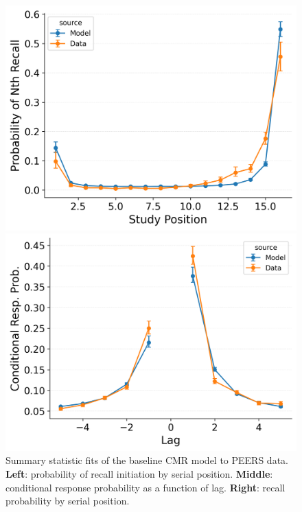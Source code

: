 \documentclass[
  man,
  floatsintext,
  longtable,
  nolmodern,
  notxfonts,
  notimes,
  draftfirst,
  colorlinks=true,linkcolor=blue,citecolor=blue,urlcolor=blue]{apa7}
\begin{document}
\begin{figure}

\caption{\label{fig-cmr}Summary statistic fits of the baseline CMR model
to PEERS data. \textbf{Left}: probability of recall initiation by serial
position. \textbf{Middle}: conditional response probability as a
function of lag. \textbf{Right}: recall probability by serial position.}

\begin{minipage}{0.33\linewidth}
\includegraphics{figures/HealeyKahana2014_BaseCMR_Fitting_pnr.png}\end{minipage}%
%
\begin{minipage}{0.33\linewidth}
\includegraphics{figures/HealeyKahana2014_BaseCMR_Fitting_crp.png}\end{minipage}%

\end{figure}
\end{document}

